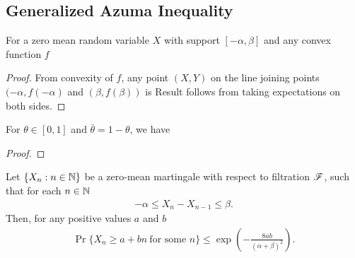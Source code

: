 \documentclass[a4paper,10pt,english]{article}
\begin{document}
\subsection{Generalized Azuma Inequality}
\begin{lem}
For a zero mean random variable $X$ with support $[-\alpha, \beta]$ and any convex function $f$ 
\end{lem}
\begin{proof}
From convexity of $f$, any point $(X, Y)$ on the line joining points $(-\alpha, f(-\alpha)$ and $(\beta, f(\beta))$ is
Result follows from taking expectations on both sides.
\end{proof}
\begin{lem} 
For $\theta \in [0,1]$ and $\bar{\theta} = 1 - \theta$, we have
\end{lem}
\begin{proof}
\end{proof}
\begin{prop}
Let $\{X_n : n \in \mathbb{N} \}$ be a zero-mean martingale with respect to filtration $\mathscr{F}$, 
such that for each $n \in \mathbb{N}$
\begin{align*}
-\alpha \leq X_n-X_{n-1} \leq \beta.
\end{align*}
Then, for any positive values $a$ and $b$
\begin{align*}
\label{GenAzumaLemma}
\Pr\{X_n \geq a+bn ~ \text{for some }n\} \leq \exp\left(-\frac{8ab}{({\alpha+\beta})^2}\right).
\end{align*}
\end{prop}
\end{document}
